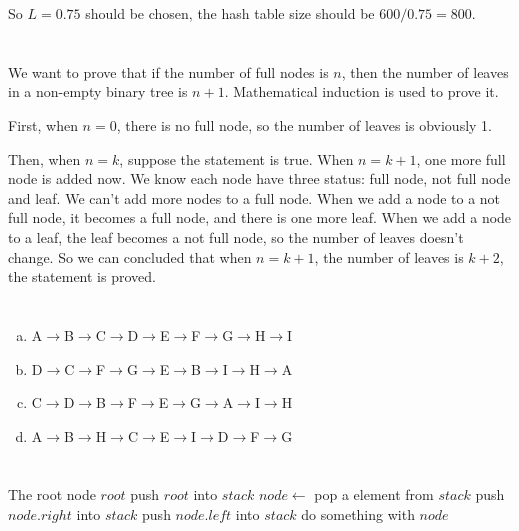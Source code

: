 \documentclass{article}
\begin{document}
So $L=0.75$ should be chosen, the hash table size should be $600/0.75=800$.

\section{}
We want to prove that if the number of full nodes is $n$, then  the number of leaves in a non-empty binary tree is $n+1$. Mathematical induction is used to prove it.

First, when $n=0$, there is no full node, so the number of leaves is obviously 1.

Then, when $n=k$, suppose the statement is true. When $n=k+1$, one more full node is added now. We know each node have three status: full node, not full node and leaf. We can't add more nodes to a full node. When we add a node to a not full node, it becomes a full node, and there is one more leaf. When we add a node to a leaf, the leaf becomes a not full node, so the number of leaves doesn't change. So we can concluded that when $n=k+1$, the number of leaves is $k+2$, the statement is proved.

\section{}
\begin{enumerate}[(a)]
\item A$\to$B$\to$C$\to$D$\to$E$\to$F$\to$G$\to$H$\to$I
\item D$\to$C$\to$F$\to$G$\to$E$\to$B$\to$I$\to$H$\to$A
\item C$\to$D$\to$B$\to$F$\to$E$\to$G$\to$A$\to$I$\to$H
\item A$\to$B$\to$H$\to$C$\to$E$\to$I$\to$D$\to$F$\to$G
\end{enumerate}

\section{}
\begin{algorithm}[H]
    \begin{algorithmic}
        \Require The root node $root$
        \State push $root$ into $stack$
            \State $node\gets$ pop a element from $stack$
            	\State push $node.right$ into $stack$
            \EndIf
            	\State push $node.left$ into $stack$
            \EndIf
            \State do something with $node$
        \EndWhile
    \end{algorithmic}  
\end{algorithm}
\end{document}
